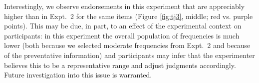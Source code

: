 \documentclass[10pt,letterpaper]{article}
\newcommand{\ndg}[1]{\textcolor{Green}{[ndg: #1]}}
\begin{document}
Interestingly, we observe endorsements in this experiment that are appreciably higher than in Expt.~2 for the same items (Figure \ref{fig:tj3}, middle; red vs. purple points). 
This may be due, in part, to an effect of the experimental context on participants: 
in this experiment the overall population of frequencies is much lower (both because we selected moderate frequencies from Expt.~2 and because of the preventative information) and participants may infer that the experimenter believes this to be a representative range and adjust judgments accordingly. Future investigation into this issue is warranted.




%
%
%
%
\end{document}
